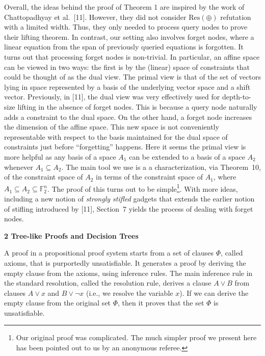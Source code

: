 \documentclass[10pt,a4paper]{article}
\begin{document}
Overall, the ideas behind the proof of Theorem 1 are inspired by the work of Chattopadhyay et al. [11].
However, they did not consider $\text{Res}(\oplus)$ refutation with a limited width.
Thus, they only needed to process query nodes to prove their lifting theorem.
In contrast, our setting also involves forget nodes, where a linear equation from the span of previously queried equations is forgotten.
It turns out that processing forget nodes is non-trivial. In particular, an affine space can be viewed in two ways: the first is by the (linear) space of constraints that could be thought of as the dual view. The primal view is that of the set of vectors lying in space represented by a basis of the underlying vector space and a shift vector. Previously, in [11], the dual view was very effectively used for depth-to-size lifting in the absence of forget nodes. This is because a query node naturally adds a constraint to the dual space. On the other hand, a forget node increases the dimension of the affine space. This new space is not conveniently representable with respect to the basis maintained for the dual space of constraints just before “forgetting” happens. Here it seems the primal view is more helpful as any basis of a space $A_{1}$ can be extended to a basis of a space $A_{2}$ whenever $A_{1}\subseteq A_{2}$. The main tool we use is a a characterization, via Theorem 10, of the constraint space of $A_{2}$ in terms of the constraint space of $A_{1}$, where $A_{1}\subseteq A_{2}\subseteq\mathbb{F}_{2}^{n}$. The proof of this turns out to be simple\footnote{Our original proof was complicated. The much simpler proof we present here has been pointed out to us by an anonymous referee.}. With more ideas, including a new notion of \emph{strongly stifled} gadgets that extends the earlier notion of stifling introduced by [11], Section 7 yields the process of dealing with forget nodes.\par






\par\medskip\noindent\textbf{
2 Tree-like Proofs and Decision Trees}\par




A proof in a propositional proof system starts from a set of clauses $\Phi$, called axioms, that is purportedly unsatisfiable. It generates a proof by deriving the empty clause from the axioms, using inference rules. The main inference rule in the standard resolution, called the resolution rule, derives a clause $A\vee B$ from clauses $A\vee x$ and $B\vee\lnot x$ (i.e., we resolve the variable $x$).
If we can derive the empty clause from the original set $\Phi$, then it proves that the set $\Phi$ is unsatisfiable.\par
\end{document}
